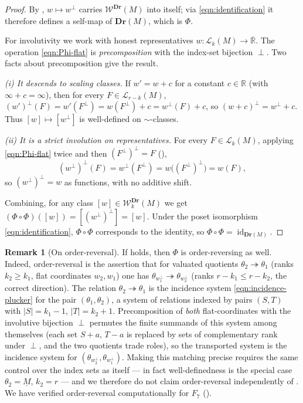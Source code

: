 \documentclass{article}
\theoremstyle{definition}
\newtheorem{remark}[theorem]{Remark}
\newcommand{\Rbar}{\overline{\mathbb{R}}}
\newcommand{\R}{\mathbb{R}}
\newcommand{\onto}{\twoheadrightarrow}
\newcommand{\Dr}{\mathbf{Dr}}
\newcommand{\cLL}{\mathcal{L}}
\newcommand{\cW}{\mathcal{W}}
\begin{document}
\begin{proof}
By , $w\mapsto w^{\perp}$ carries $\cW^{\Dr}(M)$ into itself; via
\eqref{eqn:identification} it therefore defines a self-map of $\Dr(M)$, which is $\Phi$.

For involutivity we work with honest representatives $w\colon\cLL_k(M)\to\Rbar$. The operation
\eqref{eqn:Phi-flat} is \emph{precomposition} with the index-set bijection $\perp$. Two facts about
precomposition give the result.

\emph{(i) It descends to scaling classes.} If $w'=w+c$ for a constant $c\in\R$ (with
$\infty+c=\infty$), then for every $F\in\cLL_{r-k}(M)$,
$(w')^{\perp}(F)=w'(F^{\perp})=w(F^{\perp})+c=w^{\perp}(F)+c$, so $(w+c)^{\perp}=w^{\perp}+c$. Thus
$[w]\mapsto[w^{\perp}]$ is well-defined on $\sim$-classes.

\emph{(ii) It is a strict involution on representatives.} For every $F\in\cLL_k(M)$, applying
\eqref{eqn:Phi-flat} twice and then $(F^{\perp})^{\perp}=F$ (),
\[
  (w^{\perp})^{\perp}(F)=w^{\perp}(F^{\perp})=w\bigl((F^{\perp})^{\perp}\bigr)=w(F),
\]
so $(w^{\perp})^{\perp}=w$ as functions, with no additive shift.

Combining, for any class $[w]\in\cW^{\Dr}_k(M)$ we get
$(\Phi\circ\Phi)([w])=[(w^{\perp})^{\perp}]=[w]$. Under the poset isomorphism
\eqref{eqn:identification}, $\Phi\circ\Phi$ corresponds to the identity, so
$\Phi\circ\Phi=\operatorname{id}_{\Dr(M)}$.
\end{proof}

\begin{remark}[On order-reversal]\label{rmk:rev}
If  holds, then $\Phi$ is order-reversing as well. Indeed, order-reversal is
the assertion that for valuated quotients $\theta_2\onto\theta_1$ (ranks $k_2\ge k_1$, flat
coordinates $w_2,w_1$) one has $\theta_{w_1^{\perp}}\onto\theta_{w_2^{\perp}}$ (ranks $r-k_1\le
r-k_2$, the correct direction). The relation $\theta_2\onto\theta_1$ is the incidence system
\eqref{eqn:incidence-plucker} for the pair $(\theta_1,\theta_2)$, a system of relations indexed by
pairs $(S,T)$ with $|S|=k_1-1$, $|T|=k_2+1$. Precomposition of \emph{both} flat-coordinates with the
involutive bijection $\perp$ permutes the finite summands of this system among themselves (each set
$S+a$, $T-a$ is replaced by sets of complementary rank under $\perp$, and the two quotients trade
roles), so the transported system is the incidence system for $(\theta_{w_2^{\perp}},
\theta_{w_1^{\perp}})$. Making this matching precise requires the same control over the index sets as
 itself --- in fact well-definedness is the special case
$\theta_2=\underline M$, $k_2=r$ --- and we therefore do not claim order-reversal independently of
. We have verified order-reversal computationally for $F_7$
().
\end{remark}
\end{document}
